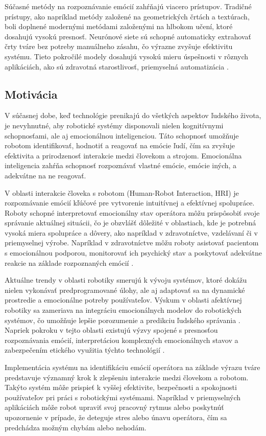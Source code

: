 Súčasné metódy na rozpoznávanie emócií zahŕňajú viacero prístupov. Tradičné prístupy, ako napríklad metódy založené na geometrických črtách a textúrach, boli doplnené modernými metódami založenými 
na hlbokom učení, ktoré dosahujú vysokú presnosť. Neurónové siete sú schopné automaticky extrahovať črty tváre bez potreby manuálneho zásahu, čo výrazne zvyšuje efektivitu systému. Tieto pokročilé 
modely dosahujú vysokú mieru úspešnosti v rôznych aplikáciách, ako sú zdravotná starostlivosť, priemyselná automatizácia \cite{article03} \cite{book01}.

\subsection{Motivácia}
V súčasnej dobe, keď technológie prenikajú do všetkých aspektov ľudského života, je nevyhnutné, aby robotické systémy disponovali nielen kognitívnymi schopnosťami, ale aj emocionálnou inteligenciou. 
Táto schopnosť umožňuje robotom identifikovať, hodnotiť a reagovať na emócie ľudí, čím sa zvyšuje efektivita a prirodzenosť interakcie medzi človekom a strojom. Emocionálna inteligencia zahŕňa schopnosť 
rozpoznávať vlastné emócie, emócie iných, a adekvátne na ne reagovať.

V oblasti interakcie človeka s robotom (Human-Robot Interaction, HRI) je rozpoznávanie emócií kľúčové pre vytvorenie intuitívnej a efektívnej spolupráce. Roboty schopné interpretovať emocionálny stav operátora 
môžu prispôsobiť svoje správanie aktuálnej situácii, čo je obzvlášť dôležité v oblastiach, kde je potrebná vysoká miera spolupráce a dôvery, ako napríklad v zdravotníctve, vzdelávaní či v priemyselnej výrobe. 
Napríklad v zdravotníctve môžu roboty asistovať pacientom s emocionálnou podporou, monitorovať ich psychický stav a poskytovať adekvátne reakcie na základe rozpoznaných emócií \cite{article01}.

Aktuálne trendy v oblasti robotiky smerujú k vývoju systémov, ktoré dokážu nielen vykonávať predprogramované úlohy, ale aj adaptovať sa na dynamické prostredie a emocionálne potreby používateľov. 
Výskum v oblasti afektívnej robotiky sa zameriava na integráciu emocionálnych modelov do robotických systémov, čo umožňuje lepšie porozumenie a predikciu ľudského správania . Napriek pokroku v tejto oblasti existujú 
výzvy spojené s presnosťou rozpoznávania emócií, interpretáciou komplexných emocionálnych stavov a zabezpečením etického využitia týchto technológií \cite{article01}.

Implementácia systému na identifikáciu emócií operátora na základe výrazu tváre predstavuje významný krok k zlepšeniu interakcie medzi človekom a robotom. Takýto systém môže prispieť k vyššej efektivite, 
bezpečnosti a spokojnosti používateľov pri práci s robotickými systémami. Napríklad v priemyselných aplikáciách môže robot upraviť svoj pracovný rytmus alebo poskytnúť upozornenie v prípade, 
že deteguje stres alebo únavu operátora, čím sa predchádza možným chybám alebo nehodám.

